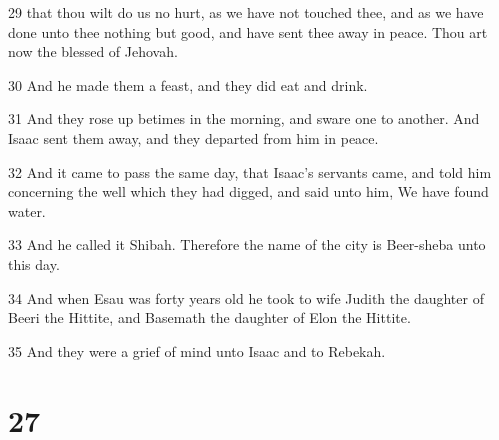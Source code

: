 \par 29 that thou wilt do us no hurt, as we have not touched thee, and as we have done unto thee nothing but good, and have sent thee away in peace. Thou art now the blessed of Jehovah.
\par 30 And he made them a feast, and they did eat and drink.
\par 31 And they rose up betimes in the morning, and sware one to another. And Isaac sent them away, and they departed from him in peace.
\par 32 And it came to pass the same day, that Isaac's servants came, and told him concerning the well which they had digged, and said unto him, We have found water.
\par 33 And he called it Shibah. Therefore the name of the city is Beer-sheba unto this day.
\par 34 And when Esau was forty years old he took to wife Judith the daughter of Beeri the Hittite, and Basemath the daughter of Elon the Hittite.
\par 35 And they were a grief of mind unto Isaac and to Rebekah.

\chapter{27}


